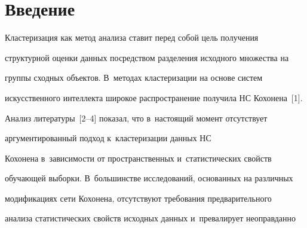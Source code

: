 









\vspace*{-14pt}



















      \thispagestyle{headings}


  


\section{Введение}





\vspace*{-5pt}





  Кластеризация как метод анализа ставит перед собой цель получения 


структурной оценки данных посредством разделения исходного множества на 


группы сходных объектов. В~методах кластеризации на основе систем 


искусственного интеллекта широкое распространение получила НС Кохонена~[1]. 


  


  Анализ литературы~[2--4] показал, что в~настоящий момент отсутствует 


аргументированный подход к~кластеризации данных НС


Кохонена в~зависимости от пространственных и~статистических свойств 


обучающей выборки. В~большинстве исследований, основанных на различных 


модификациях сети Кохонена, отсутствуют требования предварительного 


анализа статистических свойств исходных данных и~превалирует неоправданно 


